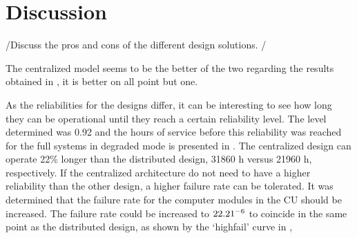 \newpage
\section{Discussion}
\label{S5}
/{Discuss the pros and cons of the different design solutions.} /



The centralized model seems to be the better of the two regarding the results obtained in , it is better on all point but one. 


As the reliabilities for the designs differ, it can be interesting to see how long they can be operational until they reach a certain reliability level. The level determined was 0.92 and the hours of service before this reliability was reached for the full systems in degraded mode is presented in . The centralized design can operate 22\% longer than the distributed design, 31860  h versus 21960 h, respectively. If the centralized architecture do not need to have a higher reliability than the other design, a higher failure rate can be tolerated. It was determined that the failure rate for the computer modules in the CU should be increased. The failure rate could be increased to $22.21 \time 10^{-6}$ to coincide in the same point as the distributed design, as shown by the `highfail' curve in , 